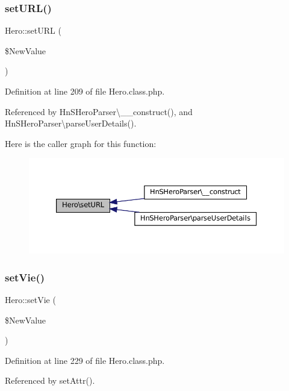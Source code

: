 \subsubsection{\texorpdfstring{set\+U\+R\+L()}{setURL()}}
{\footnotesize\ttfamily Hero\+::set\+U\+RL (\begin{DoxyParamCaption}\item[{}]{\$\+New\+Value }\end{DoxyParamCaption})}



Definition at line 209 of file Hero.\+class.\+php.



Referenced by Hn\+S\+Hero\+Parser\textbackslash{}\+\_\+\+\_\+construct(), and Hn\+S\+Hero\+Parser\textbackslash{}parse\+User\+Details().

Here is the caller graph for this function\+:\nopagebreak
\begin{figure}[H]
\begin{center}
\leavevmode
\includegraphics[width=350pt]{class_hero_a38ffcafb45800d2895a8bcf6ffde23e9_icgraph}
\end{center}
\end{figure}
\mbox{\label{class_hero_a0f2eba73b403fad9079877dd64a08e65}} 
\subsubsection{\texorpdfstring{set\+Vie()}{setVie()}}
{\footnotesize\ttfamily Hero\+::set\+Vie (\begin{DoxyParamCaption}\item[{}]{\$\+New\+Value }\end{DoxyParamCaption})}



Definition at line 229 of file Hero.\+class.\+php.



Referenced by set\+Attr().

